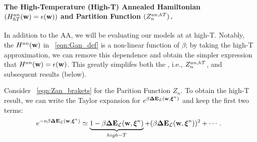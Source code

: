 \paragraph{The High-Temperature (High-T) Annealed Hamiltonian $(H^{an}_{hT}({\mathbf{w}})=\epsilon({\mathbf{w}}))$ and Partition Function $(Z^{an,hT}_{n})$. }
In addition to the AA, we will be evaluating our models at at high-T.
Notably, the \AnnealedHamiltonian $H^{an}({\mathbf{w}})$ in \EQN~\ref{eqn:Gan_def} is a non-linear function of $\beta$; by
taking the high-T approximation, we can remove this dependence and obtain
the simpler expression that $H^{an}({\mathbf{w}})=\epsilon({\mathbf{w}})$.  This greatly simplifes both
the \PartitionFunction, i.e.,  $Z^{an,hT}_{n}$, and subsequent results (below).


Consider \EQN~\ref{eqn:Zan_brakets} for the Parition Function $Z_{n}$.
To obtain the high-T result, we can write the Taylor expansion for $e^{\beta\mathbf{\Delta {E}}_{\mathcal{L}}(\mathbf{w}, \boldsymbol{\xi}^{n})}$ and keep
the first two terms:
\begin{align}
  e^{-n\beta\mathbf{\Delta {E}}_{\mathcal{L}}(\mathbf{w}, \boldsymbol{\xi}^{n})} \simeq \underbrace{1 - \beta\mathbf{\Delta {E}}_{\mathcal{L}}(\mathbf{w}, \boldsymbol{\xi}^{n})}_{high-T}+ (\beta\mathbf{\Delta {E}}_{\mathcal{L}}(\mathbf{w}, \boldsymbol{\xi}^{n}))^{2} + \cdots  .
\end{align}

